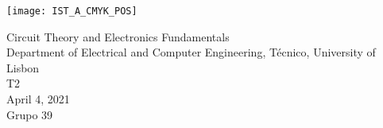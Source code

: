 
\thispagestyle {empty}

\texttt{[image: IST\_A\_CMYK\_POS]}

\begin{center}
    \vspace{1.0cm}

    \vspace{1cm}
    {\FontLb Circuit Theory and Electronics Fundamentals} \\ %
    \vspace{1cm}
    {\FontSn Department of Electrical and Computer Engineering, Técnico, University of Lisbon} \\ %
    \vspace{1cm}
    {\FontSn T2} \\
    \vspace{1cm}
    {\FontSn April 4, 2021} \\
    {\FontSn Grupo 39}
\end{center}

